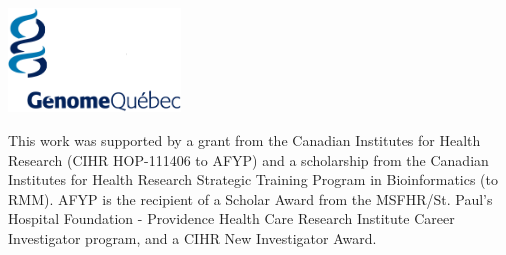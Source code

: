 \documentclass[20pt, a0paper, landscape, colspace=10mm, blockverticalspace=10mm]{tikzposter}
\begin{document}
{\begin{minipage}{0.6\linewidth}
    \quad
    \includegraphics[width=1.8in]{logos/genomequebec}
    \vspace{0.5cm}
  \end{minipage}
  \begin{adjustbox}{valign=t}
    \begin{minipage}[t]{0.4\linewidth}
      \small
      This work was supported by a grant from the Canadian Institutes for
      Health Research (CIHR HOP-111406 to AFYP) and a scholarship from the 
      Canadian Institutes for Health Research  Strategic Training Program in
      Bioinformatics (to RMM). AFYP is the recipient of a Scholar Award from
      the MSFHR/St. Paul’s Hospital Foundation - Providence Health Care
      Research Institute Career Investigator program, and a CIHR New
      Investigator Award.
    \end{minipage}
  \end{adjustbox}
}
\end{document}
